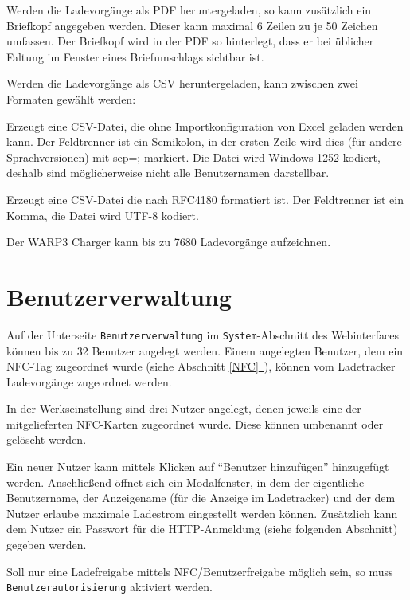\documentclass[a4paper,10pt]{article}
\newcommand*{\fullref}[1]{Abschnitt \hyperref[{#1}]{\ref*{#1}~\nameref*{#1}}}
\begin{document}
\begin{multicols*}{2}
    Werden die Ladevorgänge als PDF heruntergeladen, so kann zusätzlich ein
	Briefkopf angegeben werden. Dieser kann maximal 6 Zeilen zu je 50 Zeichen
    umfassen. Der Briefkopf wird in der PDF so hinterlegt, dass er bei üblicher Faltung im Fenster eines Briefumschlags sichtbar ist.

    Werden die Ladevorgänge als CSV heruntergeladen, kann zwischen zwei Formaten
	gewählt werden:
    \begin{description}[labelindent=0.5cm, leftmargin=0.5cm]
     \item[Excel-kompatibel] Erzeugt eine CSV-Datei, die ohne Importkonfiguration von Excel geladen werden kann. Der Feldtrenner ist ein Semikolon, in der ersten Zeile wird dies (für andere Sprachversionen) mit sep=; markiert. Die Datei wird Windows-1252 kodiert, deshalb sind möglicherweise nicht alle Benutzernamen darstellbar.
     \item[RFC4180] Erzeugt eine CSV-Datei die nach RFC4180 formatiert ist. Der Feldtrenner ist ein Komma, die Datei wird UTF-8 kodiert.
    \end{description}

    Der WARP3 Charger kann bis zu 7680 Ladevorgänge aufzeichnen.

    \newpage
    \section{Benutzerverwaltung} \label{user_management}

    Auf der Unterseite \texttt{Benutzerverwaltung} im \texttt{System}-Abschnitt des Webinterfaces können bis zu 32 Benutzer angelegt werden.
    Einem angelegten Benutzer, dem ein NFC-Tag zugeordnet wurde (siehe \fullref{NFC}), können vom Ladetracker Ladevorgänge zugeordnet werden.

    In der Werkseinstellung sind drei Nutzer angelegt,
    denen jeweils eine der mitgelieferten NFC-Karten zugeordnet wurde. Diese können
    umbenannt oder gelöscht werden.

    Ein neuer Nutzer kann mittels Klicken auf \enquote{Benutzer hinzufügen} hinzugefügt werden.
    Anschließend öffnet sich ein Modalfenster, in dem der eigentliche Benutzername, der Anzeigename (für die Anzeige im Ladetracker)
    und der dem Nutzer erlaube maximale Ladestrom eingestellt werden können.
    Zusätzlich kann dem Nutzer ein Passwort für die HTTP-Anmeldung (siehe
    folgenden Abschnitt) gegeben werden.

    Soll nur eine Ladefreigabe mittels NFC/Benutzerfreigabe möglich sein, so
    muss \texttt{Benutzerautorisierung} aktiviert werden.


\end{multicols*}
\end{document}
